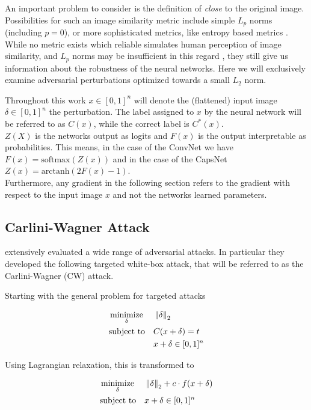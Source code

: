 An important problem to consider is the definition of \emph{close} to the original image. Possibilities for such an image similarity metric include simple $L_p$ norms (including $p=0$),
or more sophisticated metrics, like entropy based metrics \citep{umbrella}.
While no metric exists which reliable simulates human perception of image similarity, and $L_p$ norms may be insufficient in this regard \citep{lpnorms}, they still give us information about the robustness of the neural networks.
Here we will exclusively examine adversarial perturbations optimized towards a small $L_2$ norm.

Throughout this work $x \in [0,1]^n$ will denote the (flattened) input image $\delta \in [0,1]^n$ the perturbation.
The label assigned to $x$ by the neural network will be referred to as $C(x)$, while the correct label is $C^*(x)$.\\
$Z(X)$ is the networks output as logits and $F(x)$ is the output interpretable as probabilities.
This means, in the case of the ConvNet we have $F(x) = \mathrm{softmax}(Z(x))$ and in the case of the CapsNet $Z(x) = \mathrm{arctanh}(2F(x) - 1)$. \\
Furthermore, any gradient in the following section refers to the gradient with respect to the input image $x$ and not the networks learned parameters.

\subsection{Carlini-Wagner Attack}

\citet{carlini} extensively evaluated a wide range of adversarial attacks.
In particular they developed the following targeted white-box attack, that will be referred to as the Carlini-Wagner (CW) attack.

Starting with the general problem for targeted attacks

\begin{equation}
\begin{aligned}
& \operatorname*{minimize}_{\delta} && \left \lVert \delta \right \rVert _{2} \\
& \text{subject to} && C(x + \delta) = t \\
& && x + \delta \in [0,1]^n
\end{aligned}
\end{equation}

Using Lagrangian relaxation, this is transformed to

\begin{equation}
\label{eq:cwproblem}
\begin{aligned}
& \operatorname*{minimize}_{\delta} && \left \lVert \delta \right \rVert _{2} + c \cdot f(x + \delta)\\
& \text{subject to} && x + \delta \in [0,1]^n
\end{aligned}
\end{equation}

